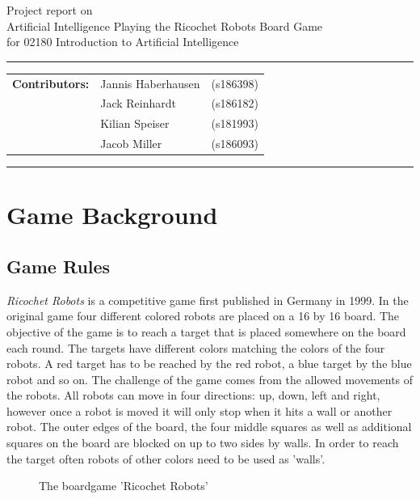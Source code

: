 \documentclass[a4paper,10pt]{article}
\begin{document}
\begin{center}
Project report on\\
\vspace{0.5cm}
{{\Large \sc Artificial Intelligence Playing the Ricochet Robots Board Game}}\\
\vspace{0.5cm} for 02180 Introduction to Artificial Intelligence
\end{center}
\rule{\textwidth}{0.5pt}
\begin{description}
\item\begin{tabular}{rll}
    \textbf{Contributors:}& Jannis Haberhausen &(s186398)\\ & Jack Reinhardt &(s186182)\\ & Kilian Speiser &(s181993)\\ & Jacob Miller &(s186093) \\
\end{tabular}
\end{description}
\rule{\textwidth}{1pt}

\tableofcontents
\thispagestyle{empty}
\newpage
\section{Game Background}
\subsection{Game Rules}
\label{sec:gameRules}
\textit{Ricochet Robots} is a competitive game first published in Germany in 1999. In the original game four different colored robots are placed on a 16 by 16 board. The objective of the game is to reach a target that is placed somewhere on the board each round. The targets have different colors matching the colors of the four robots. A red target has to be reached by the red robot, a blue target by the blue robot and so on. The challenge of the game comes from the allowed movements of the robots. All robots can move in four directions: up, down, left and right, however once a robot is moved it will only stop when it hits a wall or another robot. The outer edges of the board, the four middle squares as well as additional squares on the board are blocked on up to two sides by walls. In order to reach the target often robots of other colors need to be used as 'walls'.
\begin{figure}[!htb]
\caption{The boardgame 'Ricochet Robots'}
\label{fig:originalgame}
\end{figure}
\end{document}

